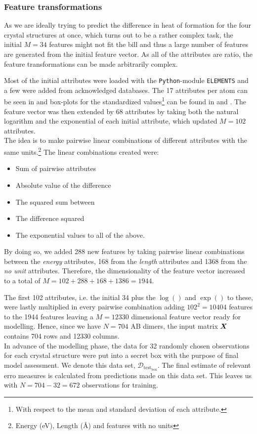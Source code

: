 \subsubsection{Feature transformations}\label{sec:featuretrans}

As we are ideally trying to predict the difference in heat of formation for the four crystal structures at once, which turns out to be a rather complex task, the initial $M=34$ features might not fit the bill and thus a large number of features are generated from the initial feature vector. As all of the attributes are ratio, the feature transformations can be made arbitrarily complex. 

Most of the initial attributes were loaded with the \texttt{Python}-module \texttt{ELEMENTS} and a few were added from acknowledged databases. The 17 attributes per atom can be seen in  and box-plots for the standardized values\footnote{With respect to the mean and standard deviation of each attribute.} can be found in  and . The feature vector was then extended by 68 attributes by taking both the natural logarithm and the exponential of each initial attribute, which updated $M=102$ attributes. \\
The idea is to make pairwise linear combinations of different attributes with the same units.\footnote{Energy (eV), Length (Å) and features with no units}
The linear combinations created were:
\begin{itemize}
        \item Sum of pairwise attributes
        \item Absolute value of the difference
        \item The squared sum between 
        \item The difference squared
        \item The exponential values to all of the above.
\end{itemize}
By doing so, we added 288 new features by taking pairwise linear combinations between the \emph{energy} attributes, 168 from the \emph{length} attributes and 1368 from the \emph{no unit} attributes. Therefore, the dimensionality of the feature vector increased to a total of $M=102+288+168+1386=1944$.

The first 102 attributes, i.e. the initial 34 plus the $\log()$ and $\exp()$ to these, were lastly multiplied in every pairwise combination adding $102^2=10404$ features to the 1944 features leaving a $M=12330$ dimensional feature vector ready for modelling.
Hence, since we have $N=704$ AB dimers, the input matrix $\bm{X}$ contains 704 rows and 12330 columns. \\ In advance of the modelling phase, the data for 32 randomly chosen observations for each crystal structure were put into a secret box with the purpose of final model assessment. We denote this data set, $\mathcal{D}_{\mathrm{test_{box}}}$. The final estimate of relevant erro
 measures is calculated from predictions made on this data set. This leaves us with $N=704-32=672$ observations for training. 

